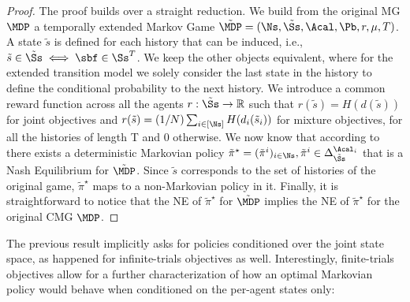 \begin{proof}
    The proof builds over a straight reduction. We build from the original MG $\MDP$ a temporally extended Markov Game $\tilde \MDP= ( \Ns, \tilde \Ss,   \Acal, \Pb, r, \mu, T)$. A state $\tilde s$ is defined for each history that can be induced, i.e., $\tilde s \in \tilde \Ss \iff \sbf \in \Ss^T $. We keep the other objects equivalent, where for the extended transition model we solely consider the last state in the history to define the conditional probability to the next history. We introduce a common reward function across all the agents $ r: \tilde \Ss \rightarrow \mathbb R$ such that $r(\tilde s) = H(d(\tilde s))$ for joint objectives and $r(\tilde s) = (1/N)\sum_{i \in [\Ns]} H(d_i(\tilde s_i))$ for mixture objectives, for all the histories of length T and $0$ otherwise. We now know that according to~\citet[Theorem 3.1,][]{leonardos2021globalconvergencemultiagentpolicy} there exists a deterministic Markovian policy $\tilde \pi^\star = (\tilde \pi^i)_{i \in \Ns}, \tilde \pi^i \in \Delta^{\Acal_i}_{\tilde \Ss}$ that is a Nash Equilibrium for $\tilde \MDP$. Since $\tilde s$ corresponds to the set of histories of the original game, $\tilde \pi^\star$ maps to a non-Markovian policy in it. Finally, it is straightforward to notice that the NE of  $\tilde \pi^\star$ for $\tilde \MDP$ implies the NE of $\tilde \pi^\star$ for the original CMG $\MDP$.
\end{proof}

The previous result implicitly asks for policies conditioned over the joint state space, as happened for infinite-trials objectives as well. Interestingly, finite-trials objectives allow for a further characterization of how an optimal Markovian policy would behave when conditioned on the per-agent states only:


